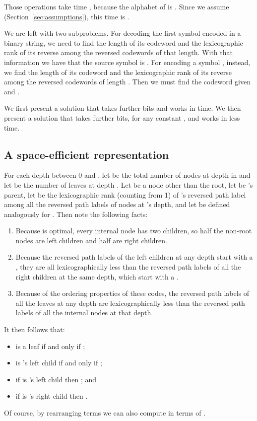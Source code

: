 \documentclass[preprint,12pt]{elsarticle}
\begin{document}
Those operations take time , because the 
alphabet of  is . Since we assume  
(Section~\ref{sec:assumptions}), this time is .



We are left with two subproblems. For decoding the first symbol encoded in a binary string, we need to find the length  of its codeword and the lexicographic rank  of its reverse among the reversed codewords of that length. With that information we have that the source symbol is . For encoding a symbol , instead, we find the length  of its codeword and the lexicographic rank  of its reverse among the reversed codewords of length . Then we must find the codeword given  and . 

We first present a solution that takes  further bits and works in  time. We then present a solution that takes  further bits, for any constant ,
 and works in less time.

\subsection{A space-efficient representation}

For each depth  between 0 and , let  be the total number of nodes at depth  in  and let  be the number of leaves at depth .  Let  be a node other than the root, let  be 's parent, let  be the lexicographic rank (counting from 1) of 's reversed path label among all the reversed path labels of nodes at 's depth, and let  be defined analogously for . Then note the following facts:
\begin{enumerate}
\item Because  is optimal, every internal node has two children, so half the non-root nodes are left children and half are right children.  
\item Because the reversed path labels of the left children at any depth 
start with a , they are all lexicographically less than the reversed path 
labels of all the right children at the same depth, which start with a .  
\item Because of the ordering properties of these codes, the reversed path labels of all the leaves at any depth are lexicographically less than the reversed path labels of all the internal nodes at that depth.
\end{enumerate}

It then follows that:
\begin{itemize}
\item  is a leaf if and only if ;
\item  is 's left child if and only if ;
\item if  is 's left child then ; and
\item if  is 's right child then .
\end{itemize}
Of course, by rearranging terms we can also compute  in terms of .
\end{document}
